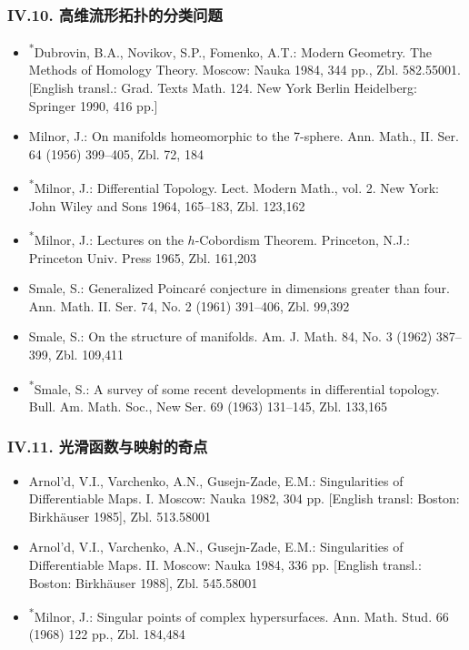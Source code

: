 
\subsubsection*{IV.10. 高维流形拓扑的分类问题}

\begin{itemize}
\item \textsuperscript{*}Dubrovin, B.A., Novikov, S.P., Fomenko, A.T.: Modern Geometry. The Methods of Homology Theory. Moscow: Nauka 1984, 344 pp., Zbl. 582.55001. [English transl.: Grad. Texts Math. 124. New York Berlin Heidelberg: Springer 1990, 416 pp.]
\item Milnor, J.: On manifolds homeomorphic to the 7-sphere. Ann. Math., II. Ser. 64 (1956) 399--405, Zbl. 72, 184
\item \textsuperscript{*}Milnor, J.: Differential Topology. Lect. Modern Math., vol. 2. New York: John Wiley and Sons 1964, 165--183, Zbl. 123,162
\item \textsuperscript{*}Milnor, J.: Lectures on the $h$-Cobordism Theorem. Princeton, N.J.: Princeton Univ. Press 1965, Zbl. 161,203
\item Smale, S.: Generalized Poincaré conjecture in dimensions greater than four. Ann. Math. II. Ser. 74, No. 2 (1961) 391--406, Zbl. 99,392
\item Smale, S.: On the structure of manifolds. Am. J. Math. 84, No. 3 (1962) 387--399, Zbl. 109,411
\item \textsuperscript{*}Smale, S.: A survey of some recent developments in differential topology. Bull. Am. Math. Soc., New Ser. 69 (1963) 131--145, Zbl. 133,165
\end{itemize}

\subsubsection*{IV.11. 光滑函数与映射的奇点}

\begin{itemize}
\item Arnol'd, V.I., Varchenko, A.N., Gusejn-Zade, E.M.: Singularities of Differentiable Maps. I. Moscow: Nauka 1982, 304 pp. [English transl: Boston: Birkhäuser 1985], Zbl. 513.58001
\item Arnol'd, V.I., Varchenko, A.N., Gusejn-Zade, E.M.: Singularities of Differentiable Maps. II. Moscow: Nauka 1984, 336 pp. [English transl.: Boston: Birkhäuser 1988], Zbl. 545.58001
\item \textsuperscript{*}Milnor, J.: Singular points of complex hypersurfaces. Ann. Math. Stud. 66 (1968) 122 pp., Zbl. 184,484
\end{itemize}


